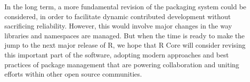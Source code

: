 In the long term, a more fundamental revision of the packaging system could be
considered, in order to facilitate dynamic contributed development without
sacrificing reliability. However, this would involve major changes in the way
libraries and namespaces are managed.
But when the time is ready to make the jump to the next major release of R, we
hope that R Core will consider revising this important part of the software,
adopting modern approaches and best practices of package management that are
powering collaboration and uniting efforts within other open source communities.



\address{Jeroen Ooms\\
  Department of Statistics\\
  University of California\\
  Los Angeles}\\


